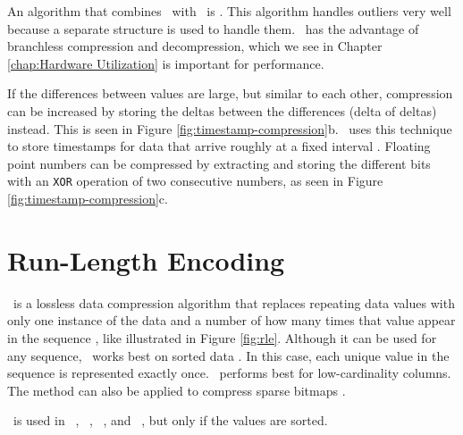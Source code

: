 An algorithm that combines \dele~with \bp~is \pfdelta \cite{Bjorklund2011-wh}. This algorithm handles outliers very well because a separate structure is used to handle them. \pfdelta~has the advantage of branchless compression and decompression, which we see in Chapter \ref{chap:Hardware Utilization} is important for performance.


If the differences between values are large, but similar to each other, compression can be increased by storing the deltas between the differences (delta of deltas) instead. This is seen in Figure \ref{fig:timestamp-compression}b. \gorilla~uses this technique to store timestamps for data that arrive roughly at a fixed interval \cite{Pelkonen2015-ko}. Floating point numbers can be compressed by extracting and storing the different bits with an \texttt{XOR} operation of two consecutive numbers, as seen in Figure \ref{fig:timestamp-compression}c.

\section{Run-Length Encoding}
\label{sec:Run-Length Encoding}


\rle~is a lossless data compression algorithm that replaces repeating data values with only one instance of the data and a number of how many times that value appear in the sequence \cite{Stoimen_undated-js}, like illustrated in Figure \ref{fig:rle}. Although it can be used for any sequence, \rle~works best on sorted data \cite{Bjorklund2011-wh, Holloway2008-rr}. In this case, each unique value in the sequence is represented exactly once. \rle~performs best for low-cardinality columns. The method can also be applied to compress sparse bitmaps \cite{Stonebraker2005-qz}.

\rle~is used in \cstore~\cite{Stonebraker2005-qz}, \vertica~\cite{Lamb2012-kg}, \oracle~\cite{Oracle2015-fs}, and \sapnw~\cite{Lemke2010-is}, but only if the values are sorted. 

